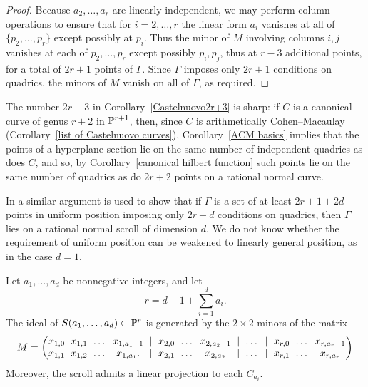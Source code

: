 \begin{proof}
Because $a_2,\dots, a_r$ are linearly independent,
we may perform column operations to ensure that for $i=2, \dots, r$
the linear form
$a_i$ vanishes at all of $\{p_2,\dots, p_{r}\}$ except possibly at $p_i$.
Thus the minor of $M$ involving columns $i,j$ vanishes at each of
$p_2,\dots, p_r$ except possibly
$p_i,p_j$, thus at 
$r-3$ additional 
points, for a total of $2r+1$ points
of $\Gamma$. Since
$\Gamma$ imposes only $2r+1$ conditions on quadrics, the minors of $M$
vanish on all of $\Gamma$,
as required.
\end{proof}

The number $2r+3$ in Corollary~\ref{Castelnuovo2r+3} is sharp: if $C$
is a canonical curve of genus $r+2$ in ${\mathbb P}^{r+1}$, then, since $C$
is arithmetically Cohen--Macaulay (Corollary~\ref{list of Castelnuovo curves}),
Corollary~\ref{ACM basics} implies that the points of a hyperplane
section lie on the same number of independent quadrics as does $C$,
and so,
by Corollary~\ref{canonical hilbert function} such points lie on the
same number of
quadrics as do $2r+2$ points on a rational normal curve.

\begin{fact}
In \cite{Montreal} a similar argument is used to show that if $\Gamma$
is a set of 
at least
$2r+1+2d$ points in uniform position
imposing only
$2r+d$ conditions on quadrics, then $\Gamma$ lies on a rational normal
scroll of dimension $d$.
We do not know whether the requirement of 
%
uniform position can be weakened
to linearly general position,
as in the case $d=1$.
\end{fact}

\begin{corollary}\label{equations of scrolls} Let $a_{1}, \dots, a_{d}$
be nonnegative integers, and let
$$r = d-1+\sum_{i=1}^{d} a_{i}.$$
The ideal of $S(a_{1},\dots,a_{d})\subset {\mathbb P}^{r}$ is generated by the
%
$2\times 2$ minors of the matrix
$$
\setcounter{MaxMatrixCols}{20}
\arraycolsep=3pt
M = \begin{pmatrix}
x_{1,0}&x_{1,1}&\dots&x_{1, a_{1}-1}&|&x_{2,0}&\dots&x_{2,
a_{2}-1}&|&\dots&|&x_{r,0}&\dots&x_{r, a_{r}-1}\\
x_{1,1}&x_{1,2}&\dots&x_{1, a_{1}}.  &|&x_{2,1}&\dots&x_{2,
a_{2}}&|&\dots&|&x_{r,1}&\dots&x_{r, a_{r}}
\end{pmatrix}
$$
Moreover, the scroll admits a linear projection to each $C_{a_i}$.
\unif
\end{corollary}


